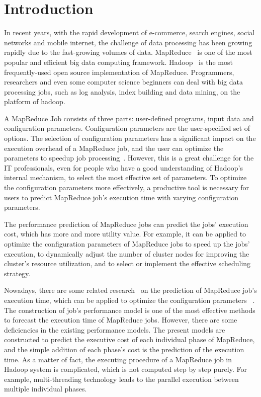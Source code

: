 \section{Introduction}
In recent years, with the rapid development of e-commerce, search engines, social networks and mobile internet,
the challenge of data processing has been growing rapidly due to the fast-growing volumes of data.
MapReduce~\cite{Dean2004MapReduce} is one of the most popular and efficient big data computing framework.
Hadoop~\cite{White2010Hadoop} is the most frequently-used open source implementation of MapReduce.
Programmers, researchers and even some computer science beginners can deal with big data processing jobs, such as log analysis, index building and data mining, on the platform of hadoop.

A MapReduce Job consists of three parts: user-defined programs, input data and configuration parameters. Configuration parameters are the user-specified set of options. The selection of configuration parameters has a significant impact on the execution overhead of a MapReduce job, and the user can optimize the parameters to speedup job processing~\cite{Herodotou2011Profiling, Shi2014MRTuner, Li2014MRONLINE}. However, this is a great challenge for the IT professionals, even for people who have a good understanding of Hadoop's internal mechanism, to select the most effective set of parameters. To optimize the configuration parameters more effectively, a productive tool is necessary for users to predict MapReduce job's execution time with varying configuration parameters.

The performance prediction of MapReduce jobs can predict the jobs' execution cost, which has more and more utility value. For example, it can be applied to optimize the configuration parameters of MapReduce jobs to speed up the jobs' execution, to dynamically adjust the number of cluster nodes for improving the cluster's resource utilization, and to select or implement the effective scheduling strategy. 


Nowadays, there are some related research~\cite{Herodotou2011Profiling, Shi2014MRTuner, Herodotou2011Hadoop} on the prediction of MapReduce job's execution time, which can be applied to optimize the configuration parameters ~\cite{Herodotou2011No}.  The construction of job's performance model is one of the most effective methods to forecast the execution time of MapReduce jobs. However, there are some deficiencies in the existing performance models. The present models are constructed to predict the executive cost of each individual phase of MapReduce, and the simple addition of each phase's cost is the prediction of the execution time. As a matter of fact, the executing procedure of a MapReduce job in Hadoop system is complicated, which is not computed step by step purely. For example, multi-threading technology leads to the parallel execution between multiple individual phases.

